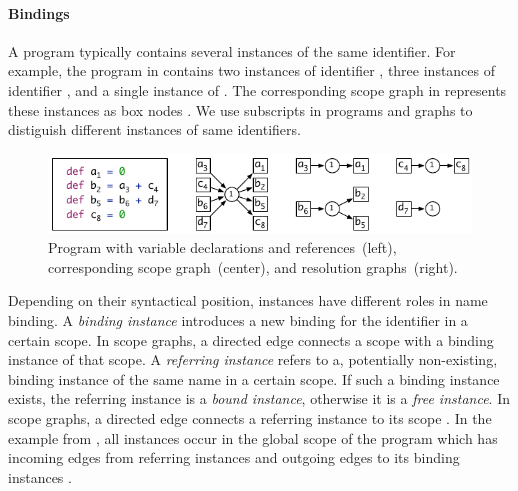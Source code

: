 
\paragraph{Bindings}

A program typically contains several instances of the same identifier.
For example, 
  the program in  contains 
    two instances of identifier , 
    three instances of identifier , 
    and a single instance of .
The corresponding scope graph in 
  represents these instances as box nodes 
    .
We use subscripts in programs and graphs to distiguish different instances of same identifiers.

\begin{figure}[htb]
\begin{center}
  \includegraphics{figures/scope-graphs/global/example}
  \caption{%
    Program with variable declarations and references~(left), 
    corresponding scope graph~(center), and resolution graphs~(right).}
\end{center}
\end{figure}

Depending on their syntactical position,
  instances have different roles in name binding.
A \emph{binding instance} introduces a new binding for the identifier in a certain scope.
In scope graphs, a directed edge  
  connects a scope  
  with a binding instance  of that scope.
A \emph{referring instance} refers to a, potentially non-existing, binding instance of the same name in a certain scope.
If such a binding instance exists, the referring instance is a \emph{bound instance},
  otherwise it is a \emph{free instance}.
In scope graphs, a directed edge  
  connects a referring instance  
  to its scope .
In the example from ,   
  all instances occur in the global scope  of the program
  which has incoming edges from referring instances 
  and outgoing edges to its binding instances .
  
